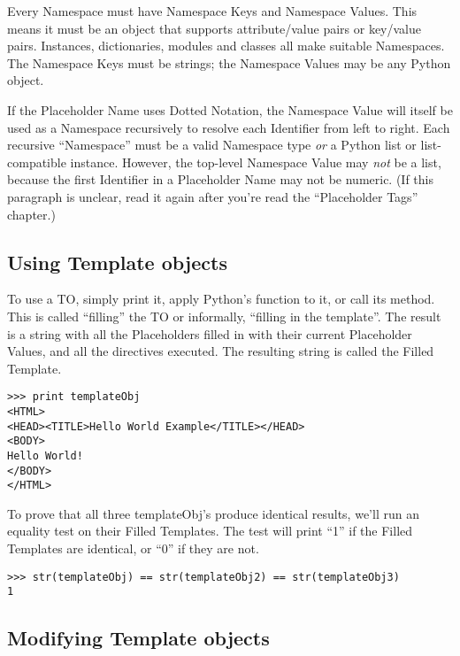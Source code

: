 Every Namespace must have Namespace Keys and Namespace Values.  This means it
must be an object that supports attribute/value pairs or key/value pairs.  
Instances, dictionaries, modules and classes all make suitable Namespaces.
The Namespace Keys must be strings; the Namespace Values may be any Python
object.

If the Placeholder Name uses Dotted Notation, the Namespace Value will itself
be used as a Namespace recursively to resolve each Identifier from left to 
right.  Each recursive ``Namespace'' must be a valid Namespace type 
{\em or} a Python list or list-compatible instance.  However, the top-level
Namespace Value may {\em not} be a list, because the first Identifier in a
Placeholder Name may not be numeric.  (If this paragraph is unclear, read it
again after you're read the ``Placeholder Tags'' chapter.)

\subsection{Using Template objects}

To use a TO, simply print it, apply Python's
 function to it, or call its  method.  This is
called ``filling'' the TO or informally,  ``filling in the template''.  The
result is a string with all the Placeholders filled in with their current
Placeholder Values, and all the directives executed.  The resulting string is
called the Filled Template.

\begin{verbatim}
>>> print templateObj
<HTML>
<HEAD><TITLE>Hello World Example</TITLE></HEAD>
<BODY>
Hello World!
</BODY>
</HTML>
\end{verbatim}

To prove that all three templateObj's produce identical results, we'll run an
equality test on their Filled Templates.  The test will print ``1'' if the
Filled Templates are identical, or ``0'' if they are not.

\begin{verbatim}
>>> str(templateObj) == str(templateObj2) == str(templateObj3)
1
\end{verbatim}


\subsection{Modifying Template objects}

